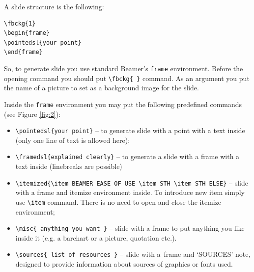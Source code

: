 \documentclass[11pt]{article}
\begin{document}
A slide structure is the following:

\begin{verbatim}
\fbckg{1}
\begin{frame}
\pointedsl{your point}
\end{frame}
\end{verbatim}

So, to generate slide you use standard Beamer's \texttt{frame} environment. Before the opening command you should put {\tt \textbackslash fbckg\{ \}} command. As an argument you put the name of a picture to set as a background image for the slide.

Inside the \texttt{frame} environment you may put the following predefined commands (see Figure \ref{fig:2}):
\begin{itemize}
\item {\tt \textbackslash pointedsl\{your point\}} -- to generate slide with a point with a text inside (only one line of text is allowed here);
\item \texttt{\textbackslash framedsl\{explained clearly\}} -- to generate a slide with a frame with a text inside (linebreaks are possible)
\item {\tt \textbackslash itemized\{\textbackslash item BEAMER EASE OF USE \textbackslash item STH \textbackslash item STH ELSE\}} -- slide with a frame and itemize environment inside. To introduce new item simply use {\tt \textbackslash item} command. There is no need to open and close the itemize environment;
\item {\tt \textbackslash misc\{\ anything you want \}} -- slide with a frame to put anything you like inside it (e.g. a barchart or a picture, quotation etc.).
\item {\tt \textbackslash sources\{\ list of resources \}} -- slide with a~frame and `SOURCES' note, designed to provide information about sources of graphics or fonts used.
\end{itemize}
\end{document}
